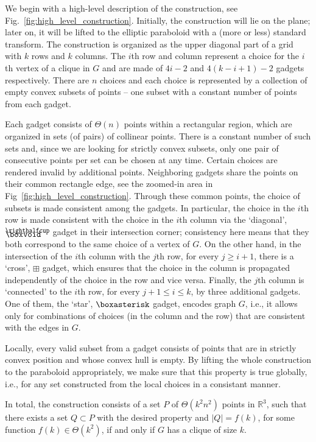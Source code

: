 \documentclass[11pt,a4paper]{article}
\let\boxplusnew\boxplus
\newcommand*{\boxangle}{\mathrel{
\vcenter{\offinterlineskip
\hbox{\scalebox{.76}[0.85]{$\righthalfcup$}}\vskip-.9ex\hbox{$\boxvoid$}}}}
\begin{document}
We begin with a high-level description of the construction, see Fig.~\ref{fig:high_level_construction}. Initially, the construction will lie on the plane; later on, it will be lifted to the elliptic paraboloid with a (more or less) standard transform. The construction is organized as the upper diagonal part of a grid with $k$ rows and $k$ columns. The $i$th row and column represent a choice for the $i$th vertex of a clique in $G$ and are made of $4i-2$ and $4(k-i+1)-2$ gadgets respectively. There are $n$ choices and each choice is represented by a collection of empty convex subsets of points -- one subset with a constant number of points from each gadget.

Each gadget consists of $\Theta(n)$ points within a rectangular region, which are organized in sets (of pairs) of collinear points. There is a constant number of such sets and, since we are looking for strictly convex subsets, only one pair of consecutive points per set can be chosen at any time. Certain choices are rendered invalid by additional points. Neighboring gadgets share the points on their common rectangle edge, see the zoomed-in area in Fig~\ref{fig:high_level_construction}. Through these common points, the choice of subsets is made consistent among the gadgets. In particular, the choice in the $i$th row is made consistent with the choice in the $i$th column via the `diagonal', $\boxangle$ gadget in their intersection corner; consistency here means that they both correspond to the same choice of a vertex of $G$. On the other hand, in the intersection of the $i$th column with the $j$th row, for every $j\geq i+1$, there is a `cross', $\boxplusnew$ gadget, which ensures that the choice in the column is propagated independently of the choice in the row and vice versa. 
Finally, the $j$th column is `connected' to the $i$th row, for every $j+1\leq i\leq k$, by three additional gadgets. One of them, the `star', $\boxasterisk$ gadget, encodes graph $G$, i.e., it allows only for combinations of choices (in the column and the row) that are consistent with the edges in $G$.

Locally, every valid subset from a gadget consists of points that are in strictly convex position and whose convex hull is empty. By lifting the whole construction to the paraboloid appropriately, we make sure that this property is true globally, i.e., for any set constructed from the local choices in a consistant manner. 

In total, the construction consists of a set $P$ of $\Theta(k^2n^2)$ points  in $\mathbb{R}^3$, such that there exists a set $Q\subset P$ with the desired property and $|Q| = f(k)$, for some function $f(k)\in \Theta(k^2)$, if and only if $G$ has a clique of size $k$.
\end{document}
